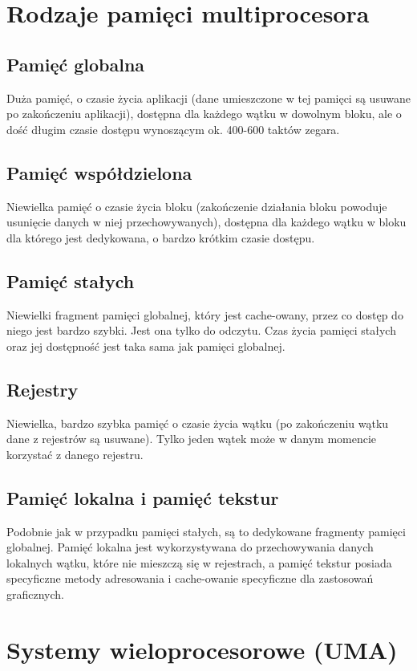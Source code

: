 \section{Rodzaje pamięci multiprocesora}
	\subsection{Pamięć globalna}
		Duża pamięć, o czasie życia aplikacji (dane umieszczone w tej pamięci są usuwane po zakończeniu aplikacji), dostępna dla każdego wątku w dowolnym bloku, ale o dość długim czasie dostępu wynoszącym ok. 400-600 taktów zegara.
	\subsection{Pamięć współdzielona}
		Niewielka pamięć o czasie życia bloku (zakończenie działania bloku powoduje usunięcie danych w niej przechowywanych), dostępna dla każdego wątku w bloku dla którego jest dedykowana, o bardzo krótkim czasie dostępu.
	\subsection{Pamięć stałych}
		Niewielki fragment pamięci globalnej, który jest cache-owany, przez co dostęp do niego jest bardzo szybki. Jest ona tylko do odczytu. Czas życia pamięci stałych oraz jej dostępność jest taka sama jak pamięci globalnej.
	\subsection{Rejestry}
		Niewielka, bardzo szybka pamięć o czasie życia wątku (po zakończeniu wątku dane z rejestrów są usuwane). Tylko jeden wątek może w danym momencie korzystać z danego rejestru.
	\subsection{Pamięć lokalna i pamięć tekstur}
		Podobnie jak w przypadku pamięci stałych, są to dedykowane fragmenty pamięci globalnej. Pamięć lokalna jest wykorzystywana do przechowywania danych lokalnych wątku, które nie mieszczą się w rejestrach, a pamięć tekstur posiada specyficzne metody adresowania i cache-owanie specyficzne dla zastosowań graficznych.

\newpage
\section{Systemy wieloprocesorowe (UMA)}
